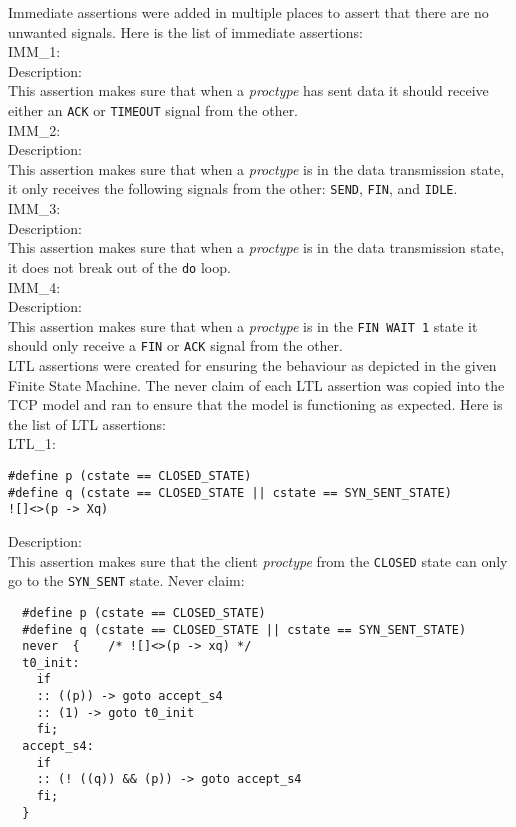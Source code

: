 \documentclass{WigReport} \usepackage{epsfig} %
\begin{document}
Immediate assertions were added in multiple places to assert that there are no unwanted signals. Here is the list of immediate assertions:
\\

IMM\_1:\\
Description:\\
This assertion makes sure that when a \textit{proctype} has sent data it should receive either an \verb|ACK| or \verb|TIMEOUT| signal from the other.
\\

IMM\_2:\\
Description:\\
This assertion makes sure that when a \textit{proctype} is in the data transmission state, it only receives the following signals from the other: \verb|SEND|, \verb|FIN|, and \verb|IDLE|.
\\

IMM\_3:\\
Description:\\
This assertion makes sure that when a \textit{proctype} is in the data transmission state, it does not break out of the \verb|do| loop.
\\

IMM\_4:\\
Description:\\
This assertion makes sure that when a \textit{proctype} is in the \verb|FIN WAIT 1| state it should only receive a \verb|FIN| or \verb|ACK| signal from the other.
\\

LTL assertions were created for ensuring the behaviour as depicted in the given Finite State Machine. The never claim of each LTL assertion was copied into the TCP model and ran to ensure that the model is functioning as expected. Here is the list of LTL assertions:
\\

LTL\_1:\\
\begin{lstlisting}
#define p (cstate == CLOSED_STATE)
#define q (cstate == CLOSED_STATE || cstate == SYN_SENT_STATE)
![]<>(p -> Xq)
\end{lstlisting}
Description:\\
This assertion makes sure that the client \textit{proctype} from the \verb|CLOSED| state can only go to the \verb|SYN_SENT| state.
Never claim:\\
\begin{lstlisting}
  #define p (cstate == CLOSED_STATE)
  #define q (cstate == CLOSED_STATE || cstate == SYN_SENT_STATE)
  never  {    /* ![]<>(p -> xq) */
  t0_init:
    if
    :: ((p)) -> goto accept_s4
    :: (1) -> goto t0_init
    fi;
  accept_s4:
    if
    :: (! ((q)) && (p)) -> goto accept_s4
    fi;
  }
\end{lstlisting}
\end{document}
